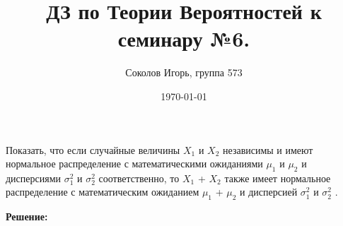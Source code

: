 \documentclass[a4paper,12pt]{article}
\author{Соколов Игорь, группа 573}
\title{ДЗ по Теории Вероятностей к семинару №6.}
\date{\today}
\begin{document}

\maketitle



\section{}

Показать, что если случайные величины $X_1$ и $X_2$ независимы и имеют нормальное распределение с математическими ожиданиями $\mu_1$ и $\mu_2$ и дисперсиями $\sigma_1^2$ и
$\sigma_2^2$ соответственно, то $X_1$ + $X_2$ также имеет нормальное распределение с математическим ожиданием $\mu_1$ + $\mu_2$ и дисперсией $\sigma_1^2$ и
$\sigma_2^2$ .

\vspace{\baselineskip}

\textbf{Решение:}
\end{document}
